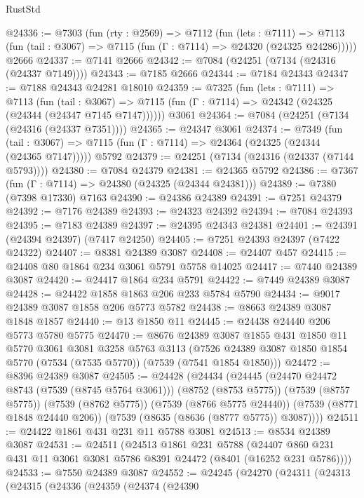 \begin{lexlean}{RustStd}
\begin{coremodule}
@24336 := @7303
    (fun (rty : @2569) =>
    @7112
      (fun (lets : @7111) =>
      @7113 (fun (tail : @3067) => @7115 (fun (Γ : @7114) => @24320 (@24325 @24286)))))
    @2666
@24337 := @7141 @2666
@24342 := @7084 (@24251 (@7134 (@24316 (@24337 @7149))))
@24343 := @7185 @2666
@24344 := @7184 @24343
@24347 := @7188 @24343 @24281 @18010
@24359 := @7325
    (fun (lets : @7111) =>
    @7113
      (fun (tail : @3067) =>
      @7115 (fun (Γ : @7114) => @24342 (@24325 (@24344 (@24347 @7145 @7147))))))
    @3061
@24364 := @7084 (@24251 (@7134 (@24316 (@24337 @7351))))
@24365 := @24347 @3061
@24374 := @7349
    (fun (tail : @3067) => @7115 (fun (Γ : @7114) => @24364 (@24325 (@24344 (@24365 @7147)))))
    @5792
@24379 := @24251 (@7134 (@24316 (@24337 (@7144 @5793))))
@24380 := @7084 @24379
@24381 := @24365 @5792
@24386 := @7367 (fun (Γ : @7114) => @24380 (@24325 (@24344 @24381)))
@24389 := @7380 (@7398 @17330) @7163
@24390 := @24386 @24389
@24391 := @7251 @24379
@24392 := @7176 @24389
@24393 := @24323 @24392
@24394 := @7084 @24393
@24395 := @7183 @24389
@24397 := @24395 @24343 @24381
@24401 := @24391 (@24394 @24397) (@7417 @24250)
@24405 := @7251 @24393 @24397 (@7422 @24322)
@24407 := @8381 @24389 @3087
@24408 := @24407 @457
@24415 := @24408 @80 @1864 @234 @3061 @5791 @5758 @14025
@24417 := @7440 @24389 @3087
@24420 := @24417 @1864 @234 @5791
@24422 := @7449 @24389 @3087
@24428 := @24422 @1858 @1863 @206 @233 @5784 @5790
@24434 := @9017 @24389 @3087 @1858 @206 @5773 @5782
@24438 := @8663 @24389 @3087 @1848 @1857
@24440 := @13 @1850 @11
@24445 := @24438 @24440 @206 @5773 @5780 @5775
@24470 := @8676
    @24389
    @3087
    @1855
    @431
    @1850
    @11
    @5770
    @3061
    @3081
    @3258
    @5763
    @3113
    (@7526 @24389 @3087 @1850 @1854 @5770 (@7534 (@7535 @5770)) (@7539 (@7541 @1854 @1850)))
@24472 := @8396 @24389 @3087
@24505 := @24428
    (@24434
      (@24445
        (@24470 @24472 @8743 (@7539 (@8745 @5764 @3061)))
        (@8752 (@8753 @5775))
        (@7539 (@8757 @5775))
        (@7539 (@8762 @5775))
        (@7539 (@8766 @5775 @24440))
        (@7539 (@8771 @1848 @24440 @206))
        (@7539 (@8635 (@8636 (@8777 @5775)) @3087))))
@24511 := @24422 @1861 @431 @231 @11 @5788 @3081
@24513 := @8534 @24389 @3087
@24531 := @24511
    (@24513
      @1861
      @231
      @5788
      (@24407 @860 @231 @431 @11 @3061 @3081 @5786 @8391 @24472 (@8401 (@16252 @231 @5786))))
@24533 := @7550 @24389 @3087
@24552 := @24245
    (@24270
      (@24311
        (@24313
          (@24315
            (@24336
              (@24359
                (@24374
                  (@24390

\end{coremodule}
\end{lexlean}
